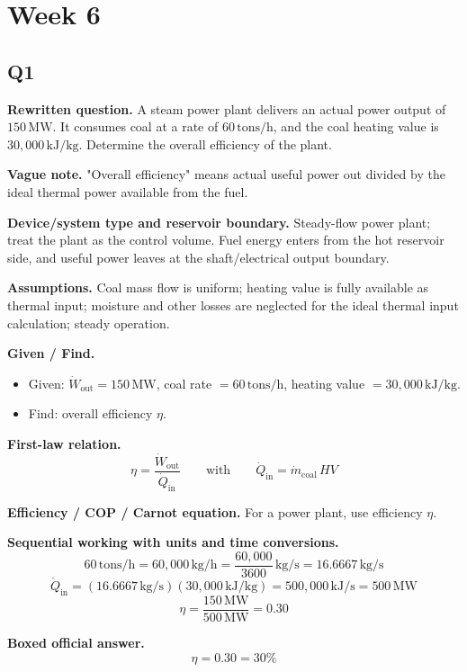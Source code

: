 \section*{Week 6}

\subsection*{Q1}
\textbf{Rewritten question.} A steam power plant delivers an actual power output of $150\,\text{MW}$. It consumes coal at a rate of $60\,\text{tons/h}$, and the coal heating value is $30{,}000\,\text{kJ/kg}$. Determine the overall efficiency of the plant.

\textbf{Vague note.} "Overall efficiency" means actual useful power out divided by the ideal thermal power available from the fuel.

\textbf{Device/system type and reservoir boundary.} Steady-flow power plant; treat the plant as the control volume. Fuel energy enters from the hot reservoir side, and useful power leaves at the shaft/electrical output boundary.

\textbf{Assumptions.} Coal mass flow is uniform; heating value is fully available as thermal input; moisture and other losses are neglected for the ideal thermal input calculation; steady operation.

\textbf{Given / Find.}
\begin{itemize}
  \item Given: $\dot W_{\text{out}}=150\,\text{MW}$, coal rate $=60\,\text{tons/h}$, heating value $=30{,}000\,\text{kJ/kg}$.
  \item Find: overall efficiency $\eta$.
\end{itemize}

\textbf{First-law relation.}
\[
\eta = \frac{\dot W_{\text{out}}}{\dot Q_{\text{in}}}
\qquad\text{with}\qquad
\dot Q_{\text{in}} = \dot m_{\text{coal}}\,HV
\]

\textbf{Efficiency / COP / Carnot equation.} For a power plant, use efficiency $\eta$.

\textbf{Sequential working with units and time conversions.}
\[
60\,\text{tons/h} = 60{,}000\,\text{kg/h} = \frac{60{,}000}{3600}\,\text{kg/s} = 16.6667\,\text{kg/s}
\]
\[
\dot Q_{\text{in}} = (16.6667\,\text{kg/s})(30{,}000\,\text{kJ/kg}) = 500{,}000\,\text{kJ/s} = 500\,\text{MW}
\]
\[
\eta = \frac{150\,\text{MW}}{500\,\text{MW}} = 0.30
\]

\textbf{Boxed official answer.}
\[
\boxed{\eta = 0.30 = 30\%}
\]

